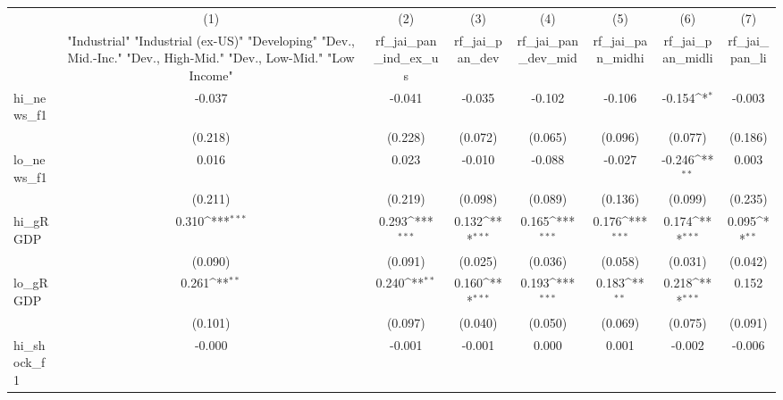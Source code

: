 {
\def\sym#1{\ifmmode^{#1}\else\(^{#1}\)\fi}
\begin{tabular}{l*{7}{c}}
\toprule
            &\multicolumn{1}{c}{(1)}&\multicolumn{1}{c}{(2)}&\multicolumn{1}{c}{(3)}&\multicolumn{1}{c}{(4)}&\multicolumn{1}{c}{(5)}&\multicolumn{1}{c}{(6)}&\multicolumn{1}{c}{(7)}\\
            &\multicolumn{1}{c}{ "Industrial" "Industrial (ex-US)" "Developing" "Dev., Mid.-Inc." "Dev., High-Mid."  "Dev., Low-Mid." "Low Income" }&\multicolumn{1}{c}{rf\_jai\_pan\_ind\_ex\_us}&\multicolumn{1}{c}{rf\_jai\_pan\_dev}&\multicolumn{1}{c}{rf\_jai\_pan\_dev\_mid}&\multicolumn{1}{c}{rf\_jai\_pan\_midhi}&\multicolumn{1}{c}{rf\_jai\_pan\_midli}&\multicolumn{1}{c}{rf\_jai\_pan\_li}\\
\midrule
hi\_news\_f1  &      -0.037         &      -0.041         &      -0.035         &      -0.102         &      -0.106         &      -0.154\sym{*}  &      -0.003         \\
            &     (0.218)         &     (0.228)         &     (0.072)         &     (0.065)         &     (0.096)         &     (0.077)         &     (0.186)         \\
\addlinespace
lo\_news\_f1  &       0.016         &       0.023         &      -0.010         &      -0.088         &      -0.027         &      -0.246\sym{**} &       0.003         \\
            &     (0.211)         &     (0.219)         &     (0.098)         &     (0.089)         &     (0.136)         &     (0.099)         &     (0.235)         \\
\addlinespace
hi\_gRGDP    &       0.310\sym{***}&       0.293\sym{***}&       0.132\sym{***}&       0.165\sym{***}&       0.176\sym{***}&       0.174\sym{***}&       0.095\sym{**} \\
            &     (0.090)         &     (0.091)         &     (0.025)         &     (0.036)         &     (0.058)         &     (0.031)         &     (0.042)         \\
\addlinespace
lo\_gRGDP    &       0.261\sym{**} &       0.240\sym{**} &       0.160\sym{***}&       0.193\sym{***}&       0.183\sym{**} &       0.218\sym{***}&       0.152         \\
            &     (0.101)         &     (0.097)         &     (0.040)         &     (0.050)         &     (0.069)         &     (0.075)         &     (0.091)         \\
\addlinespace
hi\_shock\_f1 &      -0.000         &      -0.001         &      -0.001         &       0.000         &       0.001         &      -0.002         &      -0.006         \\

\end{tabular}}
